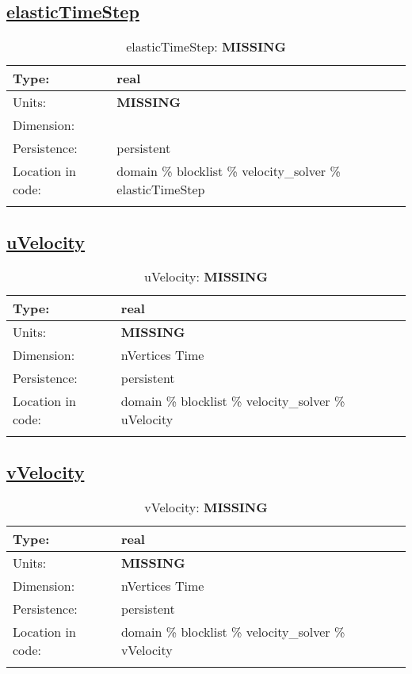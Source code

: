 \subsection[elasticTimeStep]{\hyperref[sec:var_tab_velocity_solver]{elasticTimeStep}}
\label{subsec:var_sec_velocity_solver_elasticTimeStep}
\begin{center}
\begin{longtable}{| p{2.0in} | p{4.0in} |}
        \hline 
        Type: & real \\
        \hline 
        Units: & {\bf \color{red} MISSING} \\
        \hline 
        Dimension: &  \\
        \hline 
        Persistence: & persistent \\
        \hline 
         Location in code: & domain \% blocklist \% velocity\_solver \% elasticTimeStep \\
         \hline 
    \caption{elasticTimeStep: {\bf \color{red} MISSING}}
\end{longtable}
\end{center}
\subsection[uVelocity]{\hyperref[sec:var_tab_velocity_solver]{uVelocity}}
\label{subsec:var_sec_velocity_solver_uVelocity}
\begin{center}
\begin{longtable}{| p{2.0in} | p{4.0in} |}
        \hline 
        Type: & real \\
        \hline 
        Units: & {\bf \color{red} MISSING} \\
        \hline 
        Dimension: & nVertices Time \\
        \hline 
        Persistence: & persistent \\
        \hline 
         Location in code: & domain \% blocklist \% velocity\_solver \% uVelocity \\
         \hline 
    \caption{uVelocity: {\bf \color{red} MISSING}}
\end{longtable}
\end{center}
\subsection[vVelocity]{\hyperref[sec:var_tab_velocity_solver]{vVelocity}}
\label{subsec:var_sec_velocity_solver_vVelocity}
\begin{center}
\begin{longtable}{| p{2.0in} | p{4.0in} |}
        \hline 
        Type: & real \\
        \hline 
        Units: & {\bf \color{red} MISSING} \\
        \hline 
        Dimension: & nVertices Time \\
        \hline 
        Persistence: & persistent \\
        \hline 
         Location in code: & domain \% blocklist \% velocity\_solver \% vVelocity \\
         \hline 
    \caption{vVelocity: {\bf \color{red} MISSING}}
\end{longtable}
\end{center}
